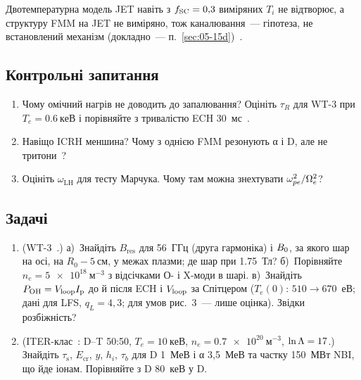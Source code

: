 Двотемпературна модель JET навіть з $f_{\mathrm{SC}}=0{,}3$ виміряних $T_i$ не відтворює, а структуру FMM на JET не виміряно, тож каналювання~--- гіпотеза, не встановлений механізм (докладно~--- п.~\ref{sec:05-15d})~\cite[с.~89, 115--116]{Tyshchenko2021}.

\subsection*{Контрольні запитання}
\begin{enumerate}
  \item Чому омічний нагрів не доводить до запалювання? Оцініть $\tau_R$ для WT-3 при $T_e=\SI{0,6}{кеВ}$ і порівняйте з тривалістю ECH \SI{30}{мс}~\cite[с.~9]{Hanada1990}.
  \item Навіщо ICRH меншина? Чому з однією FMM резонують α і D, але не тритони~\cite[с.~91]{Tyshchenko2021}?
  \item Оцініть $\omega_{\mathrm{LH}}$ для тесту Марчука. Чому там можна знехтувати $\omega_{pe}^2/\Omega_{e}^2$?
\end{enumerate}

\subsection*{Задачі}
\begin{enumerate}
  \item (WT-3~\cite{Hanada1990}.) а)~Знайдіть $B_{\mathrm{res}}$ для \SI{56}{ГГц} (друга гармоніка) і $B_{0}$, за якого шар на осі, на $R_0-\SI{5}{см}$, у межах плазми; де шар при \SI{1,75}{Тл}? б)~Порівняйте $n_e=\SI{5e18}{м^{-3}}$ з відсічками О- і X-моди в шарі. в)~Знайдіть $P_{\mathrm{OH}}=V_{\mathrm{loop}}I_{\mathrm{p}}$ до й після ECH і $V_{\mathrm{loop}}$ за Спітцером ($T_e(0)$: $510\to670$~еВ; дані для LFS, $q_L=4{,}3$; для умов рис.~3~--- лише оцінка). Звідки розбіжність?
  \item (ITER-клас~\cite{Fukuyama1992}: D--T 50:50, $T_e=\SI{10}{кеВ}$, $n_e=\SI{0,7e20}{м^{-3}}$, $\ln\Lambda=17$.) Знайдіть $\tau_{\mathrm s}$, $E_{\mathrm{cr}}$, $y$, $h_i$, $\tau_b$ для D 1~МеВ і α 3,5~МеВ та частку 150~МВт NBI, що йде іонам. Порівняйте з D 80~кеВ у D.
\end{enumerate}
